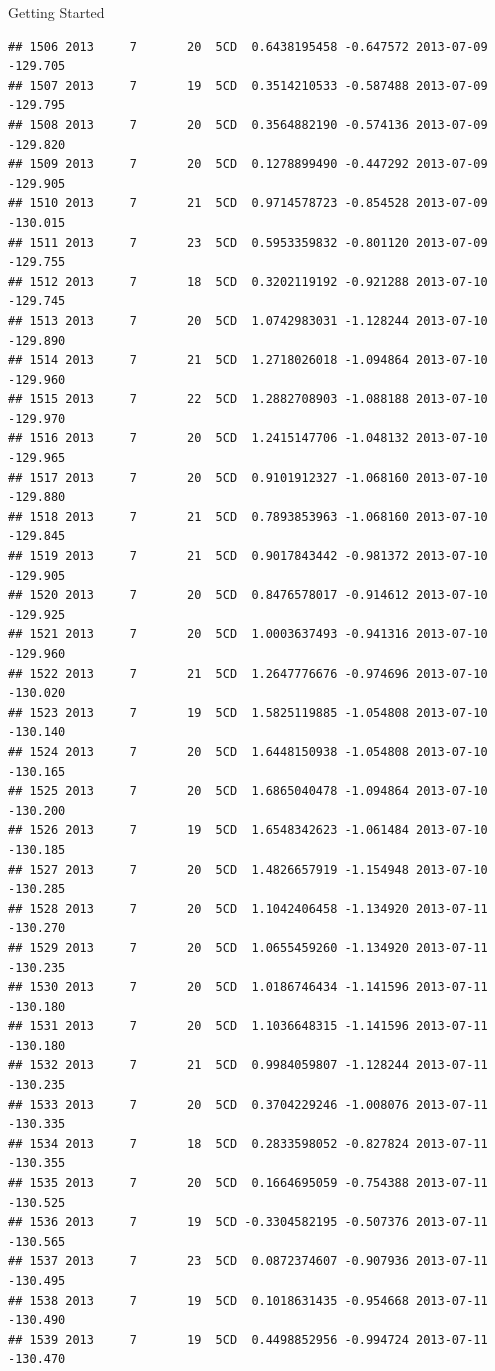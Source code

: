 \documentclass[
  ignorenonframetext,
]{beamer}
\begin{document}
\begin{frame}[fragile]{Getting Started}
\begin{verbatim}
## 1506 2013     7       20  5CD  0.6438195458 -0.647572 2013-07-09 -129.705
## 1507 2013     7       19  5CD  0.3514210533 -0.587488 2013-07-09 -129.795
## 1508 2013     7       20  5CD  0.3564882190 -0.574136 2013-07-09 -129.820
## 1509 2013     7       20  5CD  0.1278899490 -0.447292 2013-07-09 -129.905
## 1510 2013     7       21  5CD  0.9714578723 -0.854528 2013-07-09 -130.015
## 1511 2013     7       23  5CD  0.5953359832 -0.801120 2013-07-09 -129.755
## 1512 2013     7       18  5CD  0.3202119192 -0.921288 2013-07-10 -129.745
## 1513 2013     7       20  5CD  1.0742983031 -1.128244 2013-07-10 -129.890
## 1514 2013     7       21  5CD  1.2718026018 -1.094864 2013-07-10 -129.960
## 1515 2013     7       22  5CD  1.2882708903 -1.088188 2013-07-10 -129.970
## 1516 2013     7       20  5CD  1.2415147706 -1.048132 2013-07-10 -129.965
## 1517 2013     7       20  5CD  0.9101912327 -1.068160 2013-07-10 -129.880
## 1518 2013     7       21  5CD  0.7893853963 -1.068160 2013-07-10 -129.845
## 1519 2013     7       21  5CD  0.9017843442 -0.981372 2013-07-10 -129.905
## 1520 2013     7       20  5CD  0.8476578017 -0.914612 2013-07-10 -129.925
## 1521 2013     7       20  5CD  1.0003637493 -0.941316 2013-07-10 -129.960
## 1522 2013     7       21  5CD  1.2647776676 -0.974696 2013-07-10 -130.020
## 1523 2013     7       19  5CD  1.5825119885 -1.054808 2013-07-10 -130.140
## 1524 2013     7       20  5CD  1.6448150938 -1.054808 2013-07-10 -130.165
## 1525 2013     7       20  5CD  1.6865040478 -1.094864 2013-07-10 -130.200
## 1526 2013     7       19  5CD  1.6548342623 -1.061484 2013-07-10 -130.185
## 1527 2013     7       20  5CD  1.4826657919 -1.154948 2013-07-10 -130.285
## 1528 2013     7       20  5CD  1.1042406458 -1.134920 2013-07-11 -130.270
## 1529 2013     7       20  5CD  1.0655459260 -1.134920 2013-07-11 -130.235
## 1530 2013     7       20  5CD  1.0186746434 -1.141596 2013-07-11 -130.180
## 1531 2013     7       20  5CD  1.1036648315 -1.141596 2013-07-11 -130.180
## 1532 2013     7       21  5CD  0.9984059807 -1.128244 2013-07-11 -130.235
## 1533 2013     7       20  5CD  0.3704229246 -1.008076 2013-07-11 -130.335
## 1534 2013     7       18  5CD  0.2833598052 -0.827824 2013-07-11 -130.355
## 1535 2013     7       20  5CD  0.1664695059 -0.754388 2013-07-11 -130.525
## 1536 2013     7       19  5CD -0.3304582195 -0.507376 2013-07-11 -130.565
## 1537 2013     7       23  5CD  0.0872374607 -0.907936 2013-07-11 -130.495
## 1538 2013     7       19  5CD  0.1018631435 -0.954668 2013-07-11 -130.490
## 1539 2013     7       19  5CD  0.4498852956 -0.994724 2013-07-11 -130.470

\end{verbatim}
\end{frame}
\end{document}

